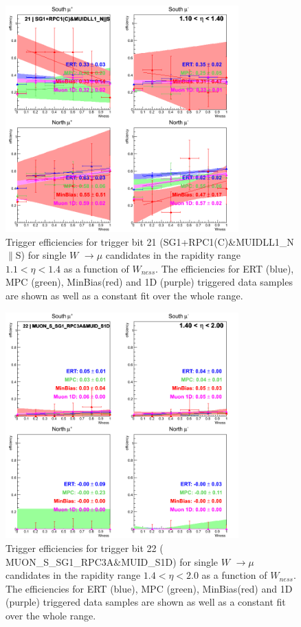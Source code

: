 \clearpage

\begin{figure}[ht]
\begin{center}
\includegraphics[width=0.8\textwidth]{./figures/run13_trigeffisn_eta0_trig21_lin.png}
\caption{\label{fig:run13_trigeffisn_eta0_nper0_trig21_lin} Trigger efficiencies for trigger bit 21 (SG1+RPC1(C)\&MUIDLL1\_N$\|$S) for single $W$ $\rightarrow \mu$ candidates in the rapidity range $ 1.1 < \eta < 1.4$ as a function of $W_{ness}$. The efficiencies for ERT (blue), MPC (green), MinBias(red) and 1D (purple) triggered data samples are shown as well as a constant fit over the whole range.}
\end{center}
\end{figure}
\begin{figure}[ht]
\begin{center}
\includegraphics[width=0.8\textwidth]{./figures/run13_trigeffisn_eta1_trig22_lin.png}
\caption{\label{fig:run13_trigeffisn_eta1_nper0_trig22_lin} Trigger efficiencies for trigger bit 22 ( MUON\_S\_SG1\_RPC3A\&MUID\_S1D) for single $W$ $\rightarrow \mu$ candidates in the rapidity range $ 1.4 < \eta < 2.0$ as a function of $W_{ness}$. The efficiencies for ERT (blue), MPC (green), MinBias(red) and 1D (purple) triggered data samples are shown as well as a constant fit over the whole range.}
\end{center}
\end{figure}

